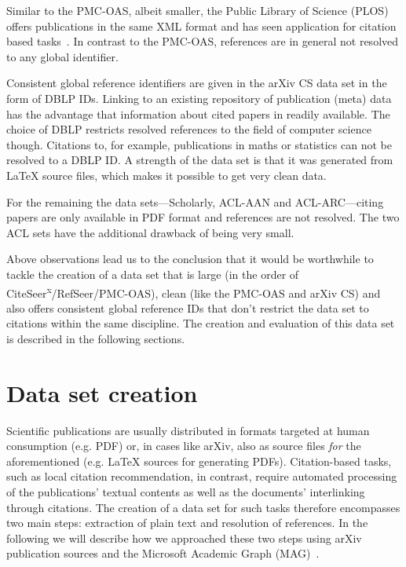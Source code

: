Similar to the PMC-OAS, albeit smaller, the Public Library of Science (PLOS) offers publications in the same XML format and has seen application for citation based tasks~\cite{Bertin2016,Bertin2018}. In contrast to the PMC-OAS, references are in general not resolved to any global identifier.

Consistent global reference identifiers are given in the arXiv CS data set in the form of DBLP IDs. Linking to an existing repository of publication (meta) data has the advantage that information about cited papers in readily available. The choice of DBLP restricts resolved references to the field of computer science though. Citations to, for example, publications in maths or statistics can not be resolved to a DBLP ID. A strength of the data set is that it was generated from \LaTeX{} source files, which makes it possible to get very clean data.

For the remaining the data sets---Scholarly, ACL-AAN and ACL-ARC---citing papers are only available in PDF format and references are not resolved. The two ACL sets have the additional drawback of being very small.

Above observations lead us to the conclusion that it would be worthwhile to tackle the creation of a data set that is large (in the order of CiteSeer\textsuperscript{x}/RefSeer/PMC-OAS), clean (like the PMC-OAS and arXiv CS) and also offers consistent global reference IDs that don't restrict the data set to citations within the same discipline. The creation and evaluation of this data set is described in the following sections.



\section{Data set creation}\label{sec:data-set-creation}
Scientific publications are usually distributed in formats targeted at human consumption (e.g. PDF) or, in cases like arXiv, also as source files \emph{for} the aforementioned (e.g. \LaTeX{} sources for generating PDFs). Citation-based tasks, such as local citation recommendation, in contrast, require automated processing of the publications' textual contents as well as the documents' interlinking through citations. The creation of a data set for such tasks therefore encompasses two main steps: extraction of plain text and resolution of references. In the following we will describe how we approached these two steps using arXiv publication sources and the Microsoft Academic Graph (MAG)~\cite{Sinha2015}.

